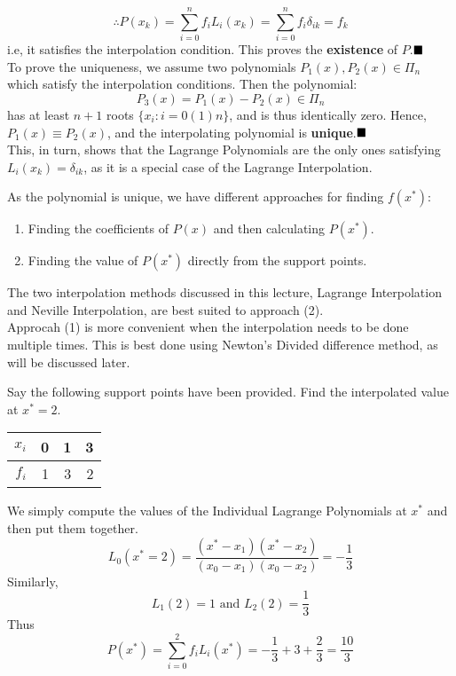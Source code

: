 $$\therefore P(x_k) = \sum_{i=0}^{n} f_i L_i(x_k) =
	\sum_{i=0}^{n} f_i \delta_{ik} = f_k$$
i.e, it satisfies the interpolation condition.
This proves the \textbf{existence} of $P$.$\hfill \blacksquare$\\[.2 cm]
To prove the uniqueness, we assume two polynomials $P_1(x),P_2(x) \in \Pi_n$ which satisfy the interpolation conditions. Then the polynomial:
$$P_3(x) = P_1(x)-P_2(x) \in \Pi_n$$ has at least $n+1$ roots $\{x_i: i = 0(1)n\}$, and is thus identically zero. Hence, $P_1(x) \equiv P_2(x)$, and the interpolating polynomial is \textbf{unique}.$ \hfill\blacksquare $\\[0.2 cm]
This, in turn, shows that the Lagrange Polynomials are the only ones satisfying $L_i(x_k) = \delta_{ik}$, as it is a special case of the Lagrange Interpolation.
\begin{rmark}
	As the polynomial is unique, we have different approaches for finding $f(x^*)$:
	\begin{enumerate}
		\item Finding the coefficients of $P(x)$ and then calculating $P(x^*)$.
		\item Finding the value of $P(x^*)$ directly from the support points.
	\end{enumerate}
	The two interpolation methods discussed in this lecture, Lagrange Interpolation and Neville Interpolation, are best suited to approach (2).\\
	Approcah (1) is more convenient when the interpolation needs to be done multiple times. This is best done using Newton's Divided difference method, as will be discussed later.
\end{rmark}
\begin{example}
	Say the following support points have been provided. Find the interpolated value at $x^* = 2$.\\[0.2 cm]
	\begin{center}
		\begin{tabular}{|r||r|r|r|}
			\hline
			$x_i$ & 0 & 1 & 3 \\
			\hline
			$f_i$ & 1 & 3 & 2 \\
			\hline
		\end{tabular}
	\end{center}
\end{example}
\begin{soln}
	We simply compute the values of the Individual Lagrange Polynomials at $x^*$ and then put them together.
	$$L_0(x^* = 2) = \frac{(x^* - x_1)(x^* - x_2)}{(x_0 - x_1)(x_0 - x_2)} = -\frac{1}{3}$$
	Similarly,
	$$L_1(2) = 1 \text{  and  } L_2(2) = \frac{1}{3}$$
	Thus $$P(x^*) = \sum_{i = 0}^2 f_i L_i(x^*) = -\frac{1}{3}+ 3 + \frac{2}{3} = \frac{10}{3}$$
\end{soln}


